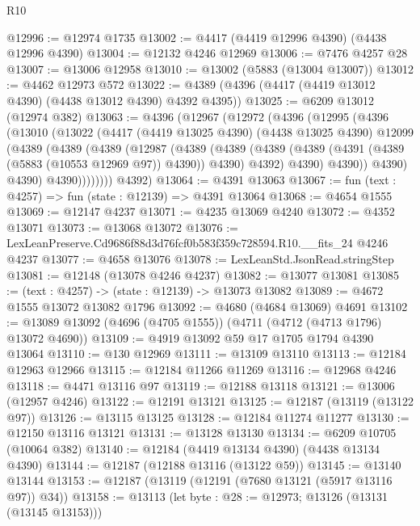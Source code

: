 \begin{lexlean}{R10}
\begin{coremodule}
@12996 := @12974 @1735
@13002 := @4417 (@4419 @12996 @4390) (@4438 @12996 @4390)
@13004 := @12132 @4246 @12969
@13006 := @7476 @4257 @28
@13007 := @13006 @12958
@13010 := @13002 (@5883 (@13004 @13007))
@13012 := @4462 @12973 @572
@13022 := @4389 (@4396 (@4417 (@4419 @13012 @4390) (@4438 @13012 @4390) @4392 @4395))
@13025 := @6209 @13012 (@12974 @382)
@13063 := @4396
    (@12967
      (@12972
        (@4396
          (@12995
            (@4396
              (@13010
                (@13022
                  (@4417
                    (@4419 @13025 @4390)
                    (@4438 @13025 @4390)
                    @12099
                    (@4389
                      (@4389
                        (@4389
                          (@12987
                            (@4389
                              (@4389
                                (@4389
                                  (@4389 (@4391 (@4389 (@5883 (@10553 @12969 @97)) @4390)) @4390)
                                  @4392)
                                @4390)
                              @4390))
                          @4390)
                        @4390)
                      @4390))))))))
      @4392)
@13064 := @4391 @13063
@13067 := fun (text : @4257) => fun (state : @12139) => @4391 @13064
@13068 := @4654 @1555
@13069 := @12147 @4237
@13071 := @4235 @13069 @4240
@13072 := @4352 @13071
@13073 := @13068 @13072
@13076 := LexLeanPreserve.Cd9686f88d3d76fcf0b583f359c728594.R10.__fits_24 @4246 @4237
@13077 := @4658 @13076
@13078 := LexLeanStd.JsonRead.stringStep
@13081 := @12148 (@13078 @4246 @4237)
@13082 := @13077 @13081
@13085 := (text : @4257) -> (state : @12139) -> @13073 @13082
@13089 := @4672 @1555 @13072 @13082 @1796
@13092 := @4680 (@4684 @13069) @4691
@13102 := @13089 @13092 (@4696 (@4705 @1555)) (@4711 (@4712 (@4713 @1796) @13072 @4690))
@13109 := @4919 @13092 @59 @17 @1705 @1794 @4390 @13064
@13110 := @130 @12969
@13111 := @13109 @13110
@13113 := @12184 @12963 @12966
@13115 := @12184 @11266 @11269
@13116 := @12968 @4246
@13118 := @4471 @13116 @97
@13119 := @12188 @13118
@13121 := @13006 (@12957 @4246)
@13122 := @12191 @13121
@13125 := @12187 (@13119 (@13122 @97))
@13126 := @13115 @13125
@13128 := @12184 @11274 @11277
@13130 := @12150 @13116 @13121
@13131 := @13128 @13130
@13134 := @6209 @10705 (@10064 @382)
@13140 := @12184 (@4419 @13134 @4390) (@4438 @13134 @4390)
@13144 := @12187 (@12188 @13116 (@13122 @59))
@13145 := @13140 @13144
@13153 := @12187 (@13119 (@12191 (@7680 @13121 (@5917 @13116 @97)) @34))
@13158 := @13113 (let byte : @28 := @12973; @13126 (@13131 (@13145 @13153)))

\end{coremodule}
\end{lexlean}
